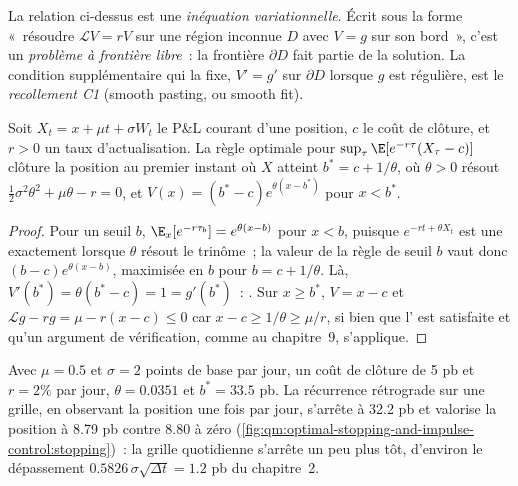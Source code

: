 \begin{definition}\label{def:qm:optimal-stopping-and-impulse-control:fbp}
La relation ci-dessus est une \emph{inéquation variationnelle}. Écrit sous la forme «~résoudre $\mathcal LV = rV$ sur
une région inconnue $D$ avec $V = g$ sur son bord~», c'est un \emph{problème à frontière libre}~:
la frontière $\partial D$ fait partie de la solution. La condition supplémentaire qui la fixe, $V' = g'$ sur $\partial D$ lorsque $g$ est
régulière, est le \emph{recollement C1} (smooth pasting, ou smooth fit).
\end{definition}

\begin{proposition}\label{prop:qm:optimal-stopping-and-impulse-control:drift}
Soit $X_t = x + \mu t + \sigma W_t$ le P\&L courant d'une position, $c$ le coût de clôture, et $r > 0$ un taux d'actualisation.
La règle optimale pour $\sup_\tau\E[e^{-r\tau}(X_\tau - c)]$ clôture la position au premier instant où $X$ atteint $b^* = c + 1/\theta$, où $\theta > 0$ résout
$\tfrac12\sigma^2\theta^2 + \mu\theta - r = 0$, et $V(x) = (b^* - c)e^{\theta(x - b^*)}$ pour $x < b^*$.
\end{proposition}

\begin{proof}
Pour un seuil $b$, $\E_x[e^{-r\tau_b}] = e^{\theta(x - b)}$ pour $x < b$, puisque $e^{-rt + \theta X_t}$ est une  exactement lorsque
$\theta$ résout le trinôme~; la valeur de la règle de seuil $b$ vaut donc $(b - c)e^{\theta(x - b)}$, maximisée en $b$ pour $b = c + 1/\theta$.
Là, $V'(b^*) = \theta(b^* - c) = 1 = g'(b^*)$~: . Sur $x \ge b^*$, $V = x - c$ et $\mathcal Lg - rg = \mu - r(x - c) \le 0$
car $x - c \ge 1/\theta \ge \mu/r$, si bien que l' est satisfaite et qu'un argument de vérification, comme au chapitre~9,
s'applique.
\end{proof}

Avec $\mu = 0.5$ et $\sigma = 2$ points de base par jour, un coût de clôture de 5 pb et $r = 2\%$ par jour, $\theta = 0.0351$ et $b^* = 33.5$ pb.
La récurrence rétrograde sur une grille, en observant la position une fois par jour, s'arrête à 32.2 pb et valorise la position à 8.79
pb contre 8.80 à zéro (\cref{fig:qm:optimal-stopping-and-impulse-control:stopping})~: la grille quotidienne s'arrête un peu plus tôt,
d'environ le dépassement $0.5826\,\sigma\sqrt{\Delta t} = 1.2$ pb du chapitre~2.

